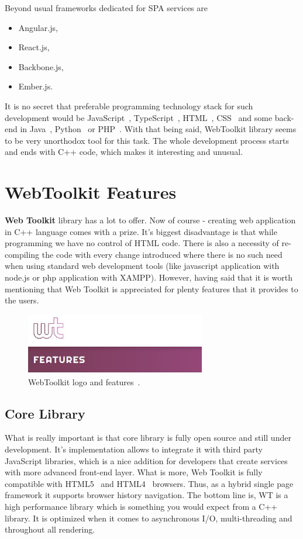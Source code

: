 \documentclass[a4paper,12pt]{book}
\newcommand\tab[1][1cm]{\hspace*{#1}}
\begin{document}
{{\bigskip
Beyond usual frameworks dedicated for SPA services are
\begin{itemize}
	\item Angular.js,
	\item React.js,
	\item Backbone.js,
	\item Ember.js.
\end{itemize}

It is no secret that preferable programming technology stack for such development would be JavaScript~\cite{javascript}, TypeScript~\cite{typescript}, HTML~\cite{html}, CSS~\cite{css} and some back-end in Java~\cite{java}, Python~\cite{python} or PHP~\cite{php}. With that being said, WebToolkit library seems to be very unorthodox tool for this task. The whole development process starts and ends with C++ code, which makes it interesting and unusual.

\newpage

}
\section{WebToolkit Features}
{
\tab \textbf{Web Toolkit} library has a lot to offer. Now of course - creating web application in C++ language comes with a prize. It's biggest disadvantage is that while programming we have no control of HTML code. There is also a necessity of re-compiling the code with every change introduced where there is no such need when using standard web development tools (like javascript application with node.js or php application with XAMPP). However, having said that it is worth mentioning that Web Toolkit is appreciated for plenty features that it provides to the users.
 
\begin{figure}[h]
  \centering
    \includegraphics[width=0.7\textwidth]{features}
    \caption{WebToolkit logo and features~\cite{wtlogo}.}
\end{figure}

\subsection*{Core Library} 
{
\tab What is really important is that core library is fully open source and still under development. It's implementation allows to integrate it with third party JavaScript libraries, which is a nice addition for developers that create services with more advanced front-end layer. What is more, Web Toolkit is fully compatible with HTML5~\cite{html5} and HTML4~\cite{html4} browsers. Thus, as a hybrid single page framework it supports browser history navigation. The bottom line is, WT is a high performance library which is something you would expect from a C++ library. It is optimized when it comes to asynchronous I/O, multi-threading and throughout all rendering.

}}}
\end{document}
